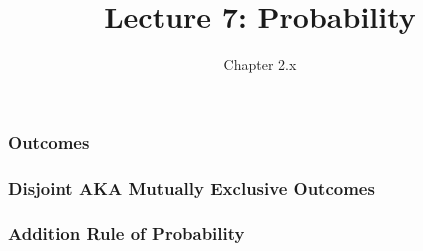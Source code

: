 \documentclass[handout]{beamer}
\title{Lecture 7: Probability}
\author{Chapter 2.x}
\date{}
\newcommand{\blue}[1]{\textcolor{blue2}{#1}}
\begin{document}
\begin{frame}
\titlepage
\end{frame}


\begin{frame}[fragile]
\frametitle{Outcomes}

%
%
%
%
%
%

\end{frame}


\begin{frame}[fragile]
\frametitle{Disjoint AKA Mutually Exclusive Outcomes}

%
%
%
%


\end{frame}


\begin{frame}[fragile]
\frametitle{Addition Rule of Probability}

%
%
%
%


\end{frame}
\end{document}
